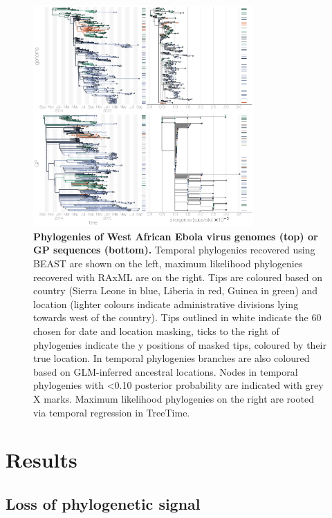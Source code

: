 \documentclass[11pt,oneside,letterpaper]{article}
\begin{document}
\begin{figure}[h]
 \centering
	\includegraphics[width=0.75\textwidth]{figures/fig1_trees.png}
	\caption{\textbf{Phylogenies of West African Ebola virus genomes (top) or GP sequences (bottom).}
	Temporal phylogenies recovered using BEAST are shown on the left, maximum likelihood phylogenies recovered with RAxML are on the right.
  Tips are coloured based on country (Sierra Leone in blue, Liberia in red, Guinea in green) and location (lighter colours indicate administrative divisions lying towards west of the country).
  Tips outlined in white indicate the 60 chosen for date and location masking, ticks to the right of phylogenies indicate the y positions of masked tips, coloured by their true location.
  In temporal phylogenies branches are also coloured based on GLM-inferred ancestral locations.
  Nodes in temporal phylogenies with <0.10 posterior probability are indicated with grey X marks.
  Maximum likelihood phylogenies on the right are rooted via temporal regression in TreeTime.
	}
	\label{trees}
\end{figure}

\section*{Results}

\subsection*{Loss of phylogenetic signal}
\end{document}
